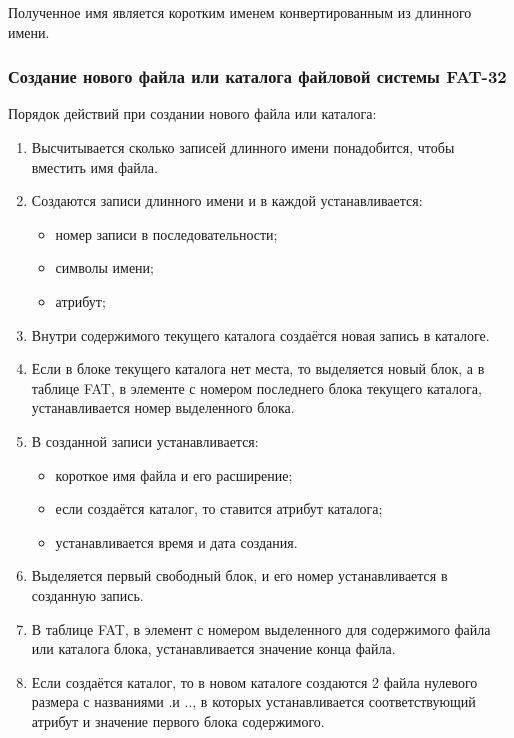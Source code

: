 Полученное имя является коротким именем конвертированным из длинного имени.

\subsubsection{Создание нового файла или каталога файловой системы FAT-32}

Порядок действий при создании нового файла или каталога:

\begin{enumerate}
\item Высчитывается сколько записей длинного имени понадобится, чтобы вместить имя файла.
\item Создаются записи длинного имени и в каждой устанавливается:

	\begin{itemize}
	\item номер записи в последовательности;
	\item символы имени;
	\item атрибут;
	\end{itemize}
	
\item Внутри содержимого текущего каталога создаётся новая запись в каталоге.
\item Если в блоке текущего каталога нет места, то выделяется новый блок, а в таблице FAT, в элементе с номером последнего блока текущего каталога, устанавливается номер выделенного блока.
\item В созданной записи устанавливается:

	\begin{itemize}
	\item короткое имя файла и его расширение;
	\item если создаётся каталог, то ставится атрибут каталога;
	\item устанавливается время и дата создания.
	\end{itemize}
	
\item Выделяется первый свободный блок, и его номер устанавливается в созданную запись.
\item В таблице FAT, в элемент с номером выделенного для содержимого файла или каталога блока, устанавливается значение конца файла.
\item Если создаётся каталог, то в новом каталоге создаются 2 файла нулевого размера с названиями \textquotedbl.\textquotedbl и \textquotedbl..\textquotedbl, в которых устанавливается соответствующий атрибут и значение первого блока содержимого.
\end{enumerate}

